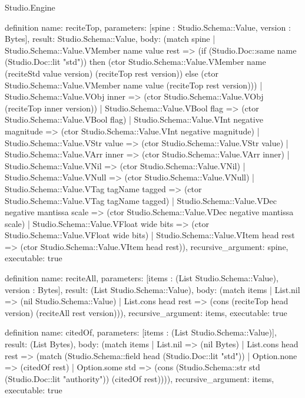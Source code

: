 \begin{lexlean}{Studio.Engine}
\begin{semanticmodule}
definition{
  name: reciteTop,
  parameters: [spine : Studio.Schema::Value, version : Bytes],
  result: Studio.Schema::Value,
  body: (match spine
    | Studio.Schema::Value.VMember name value rest => (if (Studio.Doc::same name (Studio.Doc::lit "std")) then (ctor Studio.Schema::Value.VMember name (reciteStd value version) (reciteTop rest version)) else (ctor Studio.Schema::Value.VMember name value (reciteTop rest version)))
    | Studio.Schema::Value.VObj inner => (ctor Studio.Schema::Value.VObj (reciteTop inner version))
    | Studio.Schema::Value.VBool flag => (ctor Studio.Schema::Value.VBool flag)
    | Studio.Schema::Value.VInt negative magnitude => (ctor Studio.Schema::Value.VInt negative magnitude)
    | Studio.Schema::Value.VStr value => (ctor Studio.Schema::Value.VStr value)
    | Studio.Schema::Value.VArr inner => (ctor Studio.Schema::Value.VArr inner)
    | Studio.Schema::Value.VNil => (ctor Studio.Schema::Value.VNil)
    | Studio.Schema::Value.VNull => (ctor Studio.Schema::Value.VNull)
    | Studio.Schema::Value.VTag tagName tagged => (ctor Studio.Schema::Value.VTag tagName tagged)
    | Studio.Schema::Value.VDec negative mantissa scale => (ctor Studio.Schema::Value.VDec negative mantissa scale)
    | Studio.Schema::Value.VFloat wide bits => (ctor Studio.Schema::Value.VFloat wide bits)
    | Studio.Schema::Value.VItem head rest => (ctor Studio.Schema::Value.VItem head rest)),
  recursive_argument: spine,
  executable: true
}

definition{
  name: reciteAll,
  parameters: [items : (List Studio.Schema::Value), version : Bytes],
  result: (List Studio.Schema::Value),
  body: (match items
    | List.nil => (nil Studio.Schema::Value)
    | List.cons head rest => (cons (reciteTop head version) (reciteAll rest version))),
  recursive_argument: items,
  executable: true
}

definition{
  name: citedOf,
  parameters: [items : (List Studio.Schema::Value)],
  result: (List Bytes),
  body: (match items
    | List.nil => (nil Bytes)
    | List.cons head rest => (match (Studio.Schema::field head (Studio.Doc::lit "std"))
      | Option.none => (citedOf rest)
      | Option.some std => (cons (Studio.Schema::str std (Studio.Doc::lit "authority")) (citedOf rest)))),
  recursive_argument: items,
  executable: true
}


\end{semanticmodule}
\end{lexlean}
